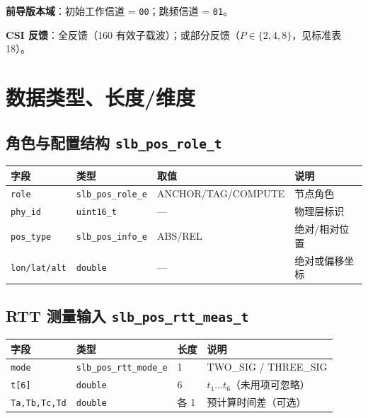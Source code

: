 \documentclass[11pt,a4paper]{ctexart}
\begin{document}
\textbf{前导版本域}：初始工作信道 = \texttt{00}；跳频信道 = \texttt{01}。

\textbf{CSI 反馈}：全反馈（160 有效子载波）；或部分反馈（$P\in\{2,4,8\}$，见标准表 18）。

\section{数据类型、长度/维度}

\subsection{角色与配置结构 \texttt{slb\_pos\_role\_t}}

\begin{table}[h]
\centering
\small
\begin{tabular}{llll}
\toprule
\textbf{字段} & \textbf{类型} & \textbf{取值} & \textbf{说明} \\
\midrule
\texttt{role} & \texttt{slb\_pos\_role\_e} & ANCHOR/TAG/COMPUTE & 节点角色 \\
\texttt{phy\_id} & \texttt{uint16\_t} & --- & 物理层标识 \\
\texttt{pos\_type} & \texttt{slb\_pos\_info\_e} & ABS/REL & 绝对/相对位置 \\
\texttt{lon/lat/alt} & \texttt{double} & --- & 绝对或偏移坐标 \\
\bottomrule
\end{tabular}
\end{table}

\subsection{RTT 测量输入 \texttt{slb\_pos\_rtt\_meas\_t}}

\begin{table}[h]
\centering
\small
\begin{tabular}{llll}
\toprule
\textbf{字段} & \textbf{类型} & \textbf{长度} & \textbf{说明} \\
\midrule
\texttt{mode} & \texttt{slb\_pos\_rtt\_mode\_e} & 1 & TWO\_SIG / THREE\_SIG \\
\texttt{t[6]} & \texttt{double} & 6 & $t_1\ldots t_6$（未用项可忽略） \\
\texttt{Ta,Tb,Tc,Td} & \texttt{double} & 各 1 & 预计算时间差（可选） \\
\bottomrule
\end{tabular}
\end{table}
\end{document}
